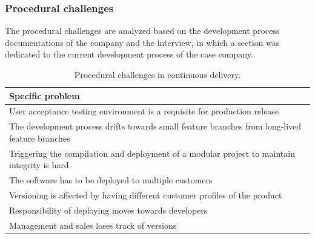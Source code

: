 \documentclass[english]{tktltiki2}
\theoremstyle{definition}
\theoremstyle{remark}
\begin{document}





\subsubsection{Procedural challenges}
The procedural challenges are analyzed based on the development process documentations of the company and the interview, in which a section was dedicated to the current development process of the case company. 

\begin{center}
\begin{table}[htb]
    \begin{tabular}{ | p{12cm} |}
    \hline
    \textbf{Specific problem} \\ \hline
    User acceptance testing environment is a requisite for production release \\ \hline
    The development process drifts towards small feature branches from long-lived feature branches \\ \hline
	Triggering the compilation and deployment of a modular project to maintain integrity is hard \\ \hline
	The software has to be deployed to multiple customers \\ \hline
	Versioning is affected by having different customer profiles of the product \\ \hline
	Responsibility of deploying moves towards developers \\ \hline
	Management and sales loses track of versions \\
    \hline
    \end{tabular}
    \caption{Procedural challenges in continuous delivery.}
    \end{table}
\end{center}
\end{document}
